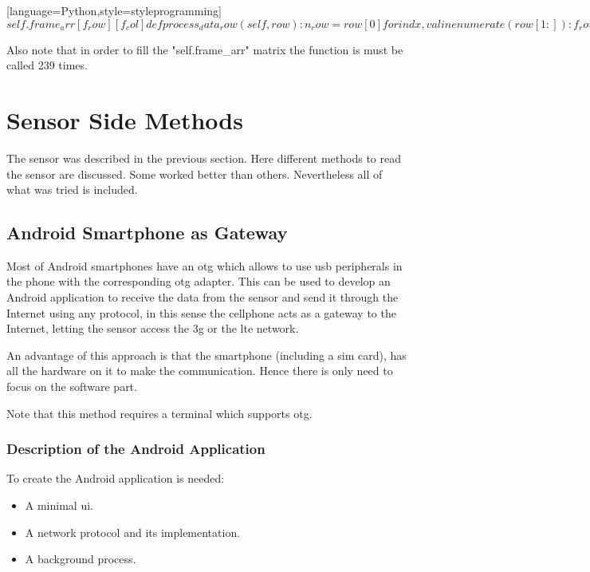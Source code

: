 \documentclass[hidelinks,11pt,a4paper,oneside,article]{memoir}
\begin{document}
[language=Python,style=styleprogramming]$
self.frame_arr[f_row][f_col]

def process_data_row(self, row):
    n_row = row[0]
    
    for indx, val in enumerate(row[1:]):
        f_row = (n_row)/2
        f_col = (n_row) %
        self.frame_arr[f_row][f_col] = val
$ 

Also note that in order to fill the "self.frame{\_}arr" matrix the function is must be called 239 times.

\section{Sensor Side Methods}
The sensor was described in the previous section. Here different methods to read the sensor are discussed. Some worked better than others. Nevertheless all of what was tried is included.

\subsection{Android Smartphone as Gateway}
Most of Android smartphones have an \gls{otg} which allows to use \gls{usb} peripherals in the phone with the corresponding \gls{otg} adapter. This can be used to develop an Android application to receive the data from the sensor and send it through the Internet using any protocol, in this sense the cellphone acts as a gateway to the Internet, letting the sensor access the \gls{3g} or the \gls{lte} network.

An advantage of this approach is that the smartphone (including a \gls{sim} card), has all the hardware on it to make the communication. Hence there is only need to focus on the software part.



Note that this method requires  a terminal which supports \gls{otg}.

\subsubsection{Description of the Android Application}
To create the Android application is needed:
\begin{itemize}
	\item A minimal \gls{ui}.
	\item A network protocol and its implementation.
	\item A background process.
\end{itemize}
\end{document}
